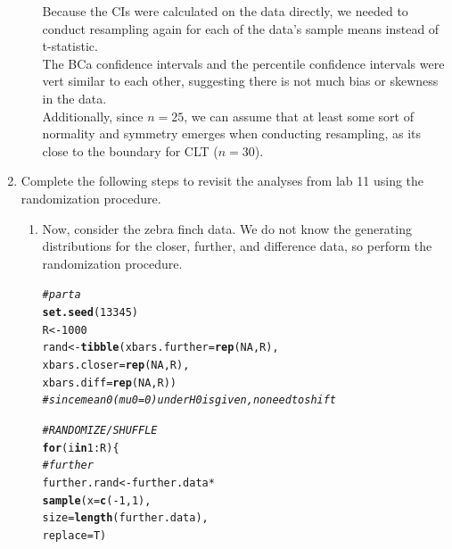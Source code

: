 \documentclass{article}\usepackage[]{graphicx}\usepackage[]{xcolor}
\makeatletter
\newcommand{\hlnum}[1]{\textcolor[rgb]{0.686,0.059,0.569}{#1}}%
\newcommand{\hlcom}[1]{\textcolor[rgb]{0.678,0.584,0.686}{\textit{#1}}}%
\newcommand{\hlopt}[1]{\textcolor[rgb]{0,0,0}{#1}}%
\newcommand{\hldef}[1]{\textcolor[rgb]{0.345,0.345,0.345}{#1}}%
\newcommand{\hlkwa}[1]{\textcolor[rgb]{0.161,0.373,0.58}{\textbf{#1}}}%
\newcommand{\hlkwb}[1]{\textcolor[rgb]{0.69,0.353,0.396}{#1}}%
\newcommand{\hlkwc}[1]{\textcolor[rgb]{0.333,0.667,0.333}{#1}}%
\newcommand{\hlkwd}[1]{\textcolor[rgb]{0.737,0.353,0.396}{\textbf{#1}}}%
\newenvironment{kframe}{%
 \def\at@end@of@kframe{}%
 \ifinner\ifhmode%
  \def\at@end@of@kframe{\end{minipage}}%
  \begin{minipage}{\columnwidth}%
 \fi\fi%
 \def\FrameCommand##1{\hskip\@totalleftmargin \hskip-\fboxsep
 \colorbox{shadecolor}{##1}\hskip-\fboxsep
     \hskip-\linewidth \hskip-\@totalleftmargin \hskip\columnwidth}%
 \MakeFramed {\advance\hsize-\width
   \@totalleftmargin\z@ \linewidth\hsize
   \@setminipage}}%
 {\par\unskip\endMakeFramed%
 \at@end@of@kframe}
\newenvironment{knitrout}{}{} %
\makeatother
\begin{document}
\begin{enumerate}
\begin{enumerate}
Because the CIs were calculated on the data directly, we needed to conduct resampling again for each of the data's sample means instead of t-statistic. \\
The BCa confidence intervals and the percentile confidence intervals were vert similar to each other, suggesting there is not much bias or skewness in the data. \\
Additionally, since $n=25$, we can assume that at least some sort of normality and symmetry emerges when conducting resampling, as its close to the boundary for CLT ($n=30$).
\end{enumerate}
\item Complete the following steps to revisit the analyses from lab 11 using the
randomization procedure.
\begin{enumerate}
\item Now, consider the zebra finch data. We do not know the generating distributions
for the closer, further, and difference data, so perform the randomization procedure. \\
\begin{knitrout}
\color{fgcolor}\begin{kframe}
\begin{alltt}
\hlcom{# part a}
\hlkwd{set.seed}\hldef{(}\hlnum{13345}\hldef{)}
\hldef{R} \hlkwb{<-} \hlnum{1000}
\hldef{rand} \hlkwb{<-} \hlkwd{tibble}\hldef{(}\hlkwc{xbars.further} \hldef{=} \hlkwd{rep}\hldef{(}\hlnum{NA}\hldef{, R),}
               \hlkwc{xbars.closer} \hldef{=} \hlkwd{rep}\hldef{(}\hlnum{NA}\hldef{, R),}
               \hlkwc{xbars.diff} \hldef{=} \hlkwd{rep}\hldef{(}\hlnum{NA}\hldef{, R))}
\hlcom{# since mean 0 (mu0 = 0) under H0 is given, no need to shift}

\hlcom{# RANDOMIZE / SHUFFLE}
\hlkwa{for}\hldef{(i} \hlkwa{in} \hlnum{1}\hlopt{:}\hldef{R)\{}
  \hlcom{# further}
  \hldef{further.rand} \hlkwb{<-} \hldef{further.data} \hlopt{*}
    \hlkwd{sample}\hldef{(}\hlkwc{x} \hldef{=} \hlkwd{c}\hldef{(}\hlopt{-}\hlnum{1}\hldef{,} \hlnum{1}\hldef{),}
           \hlkwc{size} \hldef{=} \hlkwd{length}\hldef{(further.data),}
           \hlkwc{replace} \hldef{= T)}


\end{alltt}
\end{kframe}
\end{knitrout}
\end{enumerate}
\end{enumerate}
\end{document}

